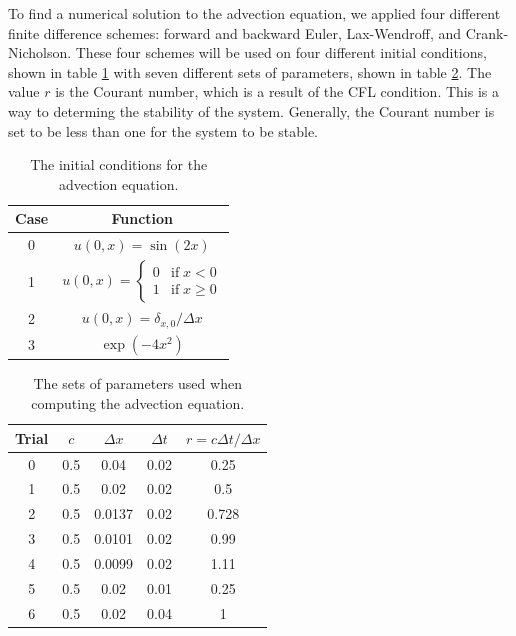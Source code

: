 \documentclass[twocolumn]{article}
\begin{document}
To find a numerical solution to the advection equation, we applied
four different finite difference schemes: forward and backward Euler,
Lax-Wendroff, and Crank-Nicholson. These four schemes will be used on
four different initial conditions, shown in table \ref{table:cases}
with seven different sets of parameters, shown in table
\ref{table:advection}. The value $r$ is the Courant number, which is a
result of the CFL condition. This is a way to determing the stability
of the system. Generally, the Courant number is set to be less than
one for the system to be stable.

\begin{table}
	\begin{centering}
		\begin{tabular}{c|c}
			Case & Function \\ \hline \hline
			0    & $u(0, x) = \sin(2 x)$ \\ \hline
			1    & $u(0, x) = \begin{cases} 0 & \text{if} \; x < 0 \\ 1 &
			\text{if} \; x \geq 0 \end{cases}$ \\ \hline
			2    & $u(0, x) = \delta_{x, 0} / \Delta x$ \\ \hline
			3    & $\exp(- 4 x^2)$
		\end{tabular}
		\caption{The initial conditions for the advection equation.}
		\label{table:cases}
	\end{centering}
\end{table}

\begin{table}
	\begin{centering}
		\begin{tabular}{c|c|c|c|c}
			Trial & $c$ & $\Delta x$ & $\Delta t$ & $r = c \Delta t / \Delta x$ \\ \hline \hline
			0     & 0.5 & 0.04       & 0.02       & 0.25                        \\ \hline
			1     & 0.5 & 0.02       & 0.02       & 0.5                         \\ \hline
			2     & 0.5 & 0.0137     & 0.02       & 0.728                       \\ \hline
			3     & 0.5 & 0.0101     & 0.02       & 0.99                        \\ \hline
			4     & 0.5 & 0.0099     & 0.02       & 1.11                        \\ \hline
			5     & 0.5 & 0.02       & 0.01       & 0.25                        \\ \hline
			6     & 0.5 & 0.02       & 0.04       & 1
		\end{tabular}
		\caption{The sets of parameters used when computing the advection equation.}
		\label{table:advection}
	\end{centering}
\end{table}
\end{document}
